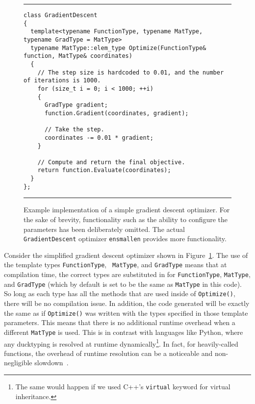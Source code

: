 \begin{figure}[t]
\hrule
\vspace{1ex}
\begin{verbatim}
class GradientDescent
{
  template<typename FunctionType, typename MatType, typename GradType = MatType>
  typename MatType::elem_type Optimize(FunctionType& function, MatType& coordinates)
  {
    // The step size is hardcoded to 0.01, and the number of iterations is 1000.
    for (size_t i = 0; i < 1000; ++i)
    {
      GradType gradient;
      function.Gradient(coordinates, gradient);

      // Take the step.
      coordinates -= 0.01 * gradient;
    }

    // Compute and return the final objective.
    return function.Evaluate(coordinates);
  }
};
\end{verbatim}
\hrule
\vspace*{-0.5em}
\caption{Example implementation of a simple gradient descent optimizer.
For the sake of brevity, functionality such as the ability to configure the parameters has
been deliberately omitted.
The actual {\tt GradientDescent} optimizer {\tt ensmallen} provides more functionality.
}

\label{fig:gd}
\end{figure}

Consider the simplified gradient descent optimizer shown in Figure~\ref{fig:gd}.
The use of the template types {\tt FunctionType}, {\tt
MatType}, and {\tt GradType} means that at compilation time, the correct types are
substituted in for {\tt FunctionType}, {\tt MatType}, and {\tt GradType} (which
by default is set to be the same as {\tt MatType} in this code).  So long as
each type has all the methods that are used inside of {\tt Optimize()}, there
will be no compilation issue.  In addition, the code generated will be exactly
the same as if {\tt Optimize()} was written with the types specified in those
template parameters.  This means that there is no additional runtime overhead
when a different {\tt MatType} is used.  This is in contrast with languages like
Python, where any ducktyping is resolved at runtime dynamically\footnote{The
same would happen if we used C++'s {\tt virtual} keyword for virtual
inheritance. }.
In fact, for heavily-called functions, the overhead of runtime
resolution can be a noticeable and non-negligible slowdown~\cite{TODO}.


